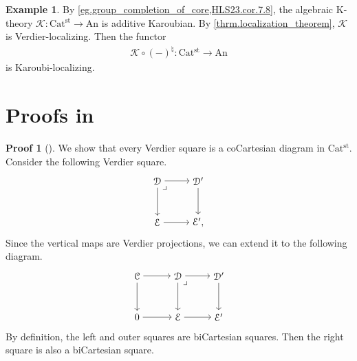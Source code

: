 \documentclass[a4paper,dvipdfmx,11pt,reqno]{amsart}
\newcommand{\C}{\mathcal{C}}
\newcommand{\D}{\mathcal{D}}
\newcommand{\E}{\mathcal{E}}
\newcommand{\K}{\mathcal{K}}
\newcommand{\An}{\mathrm{An}}
\newcommand{\Catst}{\mathrm{Cat^{st}}}
\theoremstyle{definition}
\newtheorem{example}[theorem]{Example}
\newtheorem{newproof}[theorem]{Proof}
\begin{document}
\begin{example} \label{Ber.cor.5.52}
  By \cref{eg.group_completion_of_core,HLS23.cor.7.8}, the algebraic K-theory $\K : \Catst \to \An$ is additive Karoubian.
  By \cref{thrm.localization_theorem}, $\K$ is Verdier-localizing.
  Then the functor 
  \begin{align*}
    \K \circ (-)^{\natural} : \Catst \to \An
  \end{align*}
  is Karoubi-localizing.
\end{example}

\newpage
\appendix


\section{Proofs in }

\begin{newproof}[] \label{proof_of_Ber.rem.3.53}
  We show that every Verdier square is a coCartesian diagram in $\Catst$.
  Consider the following Verdier square.
  \[\begin{tikzpicture}[auto,->] 
    \node (tl) at (0,1.5) {$\D$}; 
    \node (tr) at (1.5,1.5) {$\D'$};
    \node (bl) at (0,0) {$\E$}; 
    \node (br) at (1.5,0) {$\E',$}; 
    \draw (tl) -- node {} (tr); 
    \draw (bl) -- node[swap] {} (br); 
    \draw (tl) -- node[swap] {} (bl);
    \draw (tr) -- node {} (br); 
    \node at (tl.south east) {$\lrcorner$};
  \end{tikzpicture}\]
  Since the vertical maps are Verdier projections, we can extend it to the following diagram.
  \[\begin{tikzpicture}[auto,->] 
    \node (tl) at (0,1.5) {$\C$};
    \node (tm) at (1.5,1.5) {$\D$}; 
    \node (tr) at (3,1.5) {$\D'$};
    \node (bl) at (0,0) {$0$}; 
    \node (bm) at (1.5,0) {$\E$};
    \node (br) at (3,0) {$\E'$}; 
    \draw (tl) -- node {} (tm); 
    \draw (tm) -- node {} (tr); 
    \draw (bl) -- node[swap] {} (bm); 
    \draw (bm) -- node[swap] {} (br); 
    \draw (tl) -- node[swap] {} (bl);
    \draw (tm) -- node {} (bm);
    \draw (tr) -- node {} (br);
    \node at (tm.south east) {$\lrcorner$};
  \end{tikzpicture}\]
  By definition, the left and outer squares are biCartesian squares.
  Then the right square is also a biCartesian square.
\end{newproof}
\end{document}
